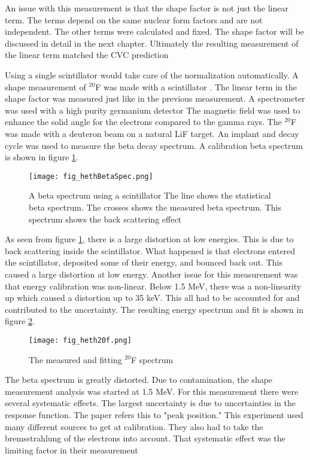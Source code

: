 \documentclass[main.tex]{subfiles}
\begin{document}
An issue with this measurement is that the shape factor is not just the linear term.
The terms depend on the same nuclear form factors and are not independent.
The other terms were calculated and fixed.
The shape factor will be discussed in detail in the next chapter.
Ultimately the resulting measurement of the linear term matched the CVC prediction

Using a single scintillator would take care of the normalization automatically. 
A shape measurement of $^{20}$F was made with a scintillator \cite{Het89}.
The linear term in the shape factor was measured just like in the previous measurement.
A spectrometer was used with a high purity germanium detector
The magnetic field was used to enhance the solid angle for the electrons compared to the gamma rays.
The $^{20}$F was made with a deuteron beam on a natural LiF target. 
An implant and decay cycle was used to measure the beta decay spectrum. 
A calibration beta spectrum is shown in figure \ref{fig:hethspec}.

\begin{figure}[!htb]
	\centerline{\texttt{[image: fig\_hethBetaSpec.png]}}
	\caption{A beta spectrum using a scintillator \cite{Het89}
		    The line shows the statistical beta spectrum.
		    The crosses shows the measured beta spectrum.
		    This spectrum shows the back scattering effect}
	\label{fig:hethspec}
\end{figure}

As seen from figure \ref{fig:hethspec}, there is a large distortion at low energies.
This is due to back scattering inside the scintillator.
What happened is that electrons entered the scintillator, deposited some of their energy, and bounced back out.
This caused a large distortion at low energy.
Another issue for this measurement was that energy calibration was non-linear.
Below 1.5 MeV, there was a non-linearity up which caused a distortion up to 35 keV. 
This all had to be accounted for and contributed to the uncertainty.
The resulting energy spectrum and fit is shown in figure \ref{fig:heth20Fspec}.

\begin{figure}[!htb]
	\centerline{\texttt{[image: fig\_heth20f.png]}}
	\caption{The measured and fitting $^{20}$F spectrum \cite{Het89}}
	\label{fig:heth20Fspec}
\end{figure}

The beta spectrum is greatly distorted.
Due to contamination, the shape measurement analysis was started at 1.5 MeV.
For this measurement there were several systematic effects.
The largest uncertainty is due to uncertainties in the response function.
The paper refers this to "peak position." 
This experiment used many different sources to get at calibration.
They also had to take the bremsstrahlung of the electrons into account.
That systematic effect was the limiting factor in their measurement
\end{document}
